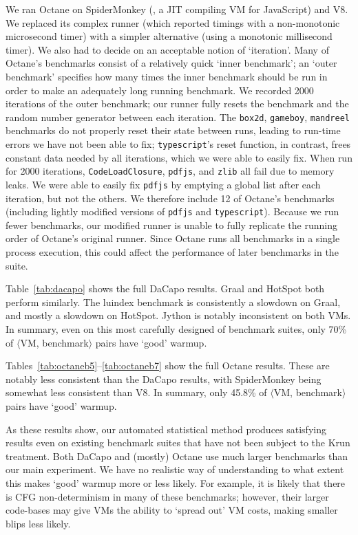 \documentclass[acmlarge]{acmart}\settopmatter{printfolios=true}
\newcommand{\krun}{Krun\xspace}
\newcommand{\vmbpair}{$\langle$VM, benchmark$\rangle$\xspace}
\begin{document}
We ran Octane on SpiderMonkey (\spidermonkeyversion, a JIT compiling VM for JavaScript) and V8.
We replaced its complex runner (which reported timings with a non-monotonic
microsecond timer) with a simpler alternative (using a monotonic millisecond
timer). We also had to decide on an acceptable notion of `iteration'. Many of Octane's
benchmarks consist of a relatively quick `inner benchmark'; an `outer benchmark'
specifies how many times the inner benchmark should be run in order to make an
adequately long running benchmark. We recorded 2000 iterations of the outer benchmark; our runner
fully resets the benchmark and the random number generator between each
iteration. The \texttt{box2d}, \texttt{gameboy}, \texttt{mandreel} benchmarks do
not properly reset their state between runs, leading to run-time errors we have
not been able to fix; \texttt{typescript}'s reset function, in contrast,
frees constant data needed by all iterations, which we were able
to easily fix. When run for 2000 iterations, \texttt{CodeLoadClosure},
\texttt{pdfjs}, and \texttt{zlib} all fail due to memory leaks. We were able to
easily fix \texttt{pdfjs} by emptying a global list after each iteration, but not the
others. We therefore include 12 of Octane's benchmarks (including lightly
modified versions of \texttt{pdfjs} and \texttt{typescript}).
Because we run fewer benchmarks, our modified runner is unable to fully
replicate the running order of Octane's original runner. Since Octane runs all
benchmarks in a single process execution, this could affect the performance of
later benchmarks in the suite.

Table~\ref{tab:dacapo} shows the full DaCapo results. Graal and HotSpot both
perform similarly. The luindex benchmark is consistently a slowdown on Graal,
and mostly a slowdown on HotSpot. Jython is notably inconsistent on both VMs. In
summary, even on this most carefully designed of benchmark suites, only 70\%
of \vmbpair pairs have `good' warmup.

Tables~\ref{tab:octaneb5}--\ref{tab:octaneb7} show the full Octane results. These are notably less
consistent than the DaCapo results, with SpiderMonkey being somewhat less
consistent than V8. In summary, only 45.8\% of \vmbpair pairs have `good'
warmup.

As these results show, our automated statistical method produces satisfying
results even on existing benchmark suites that have not been subject to the
\krun treatment. Both DaCapo and (mostly) Octane use much larger benchmarks than
our main experiment. We have no realistic way of understanding to what extent
this makes `good' warmup more or less likely. For example, it is likely that
there is CFG non-determinism in many of these benchmarks; however, their larger
code-bases may give VMs the ability to `spread out' VM costs, making smaller
blips less likely.
\end{document}
